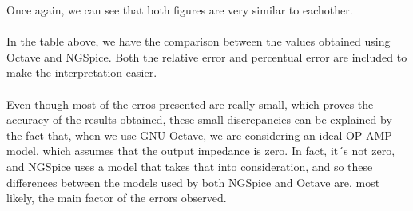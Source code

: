 Once again, we can see that both figures are very similar to eachother.

\begin{center}
   \begin{table}[H]
\end{table}
\end{center}

\paragraph{}
In the table above, we have the comparison between the values obtained using Octave and NGSpice. Both the relative error and percentual error are included to make the interpretation easier. 

\paragraph{}
Even though most of the erros presented are really small, which proves the accuracy of the results obtained, these small discrepancies can be explained by the fact that, when we use GNU Octave, we are considering an ideal OP-AMP model, which assumes that the output impedance is zero. In fact, it´s not zero, and NGSpice uses a model that takes that into consideration, and so these differences between the models used by both NGSpice and Octave are, most likely, the main factor of the errors observed. 

